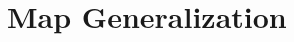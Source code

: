 \documentclass[11pt, oneside]{report}
\begin{document}




\chapter{Map Generalization}
\label{chapter:state:of:the:art:map:generalization}


\end{document}
